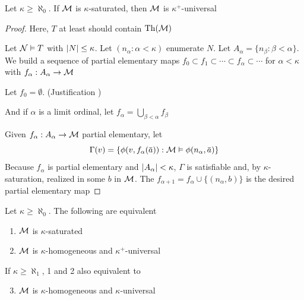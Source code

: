 \documentclass[11pt]{article}
\begin{document}
\begin{lemma}[]
\label{lemma4.3.17}
Let \(\kappa\ge\aleph_0\). If \(\mathcal{M}\) is \(\kappa\)-saturated, then \(\mathcal{M}\) is \(\kappa^+\)-universal
\end{lemma}

\begin{proof}
Here, \(T\) at least should contain \(\operatorname{Th}(\mathcal{M})\)

Let \(\mathcal{N}\vDash T\) with \(\abs{N}\le\kappa\). Let \((n_\alpha:\alpha<\kappa)\) enumerate \(N\). Let \(A_\alpha=\{n_\beta:\beta<\alpha\}\). We
build a sequence of partial elementary maps \(f_0\subset f_1\subset\cdots\subset f_\alpha\subset\cdots\) for \(\alpha<\kappa\) with \(f_\alpha:A_\alpha\to\mathcal{M}\)

Let \(f_0=\emptyset\). (Justification \label{Problem6})

And if \(\alpha\) is a limit ordinal, let \(f_\alpha=\bigcup_{\beta<\alpha}f_\beta\)

Given \(f_\alpha:A_\alpha\to\mathcal{M}\) partial elementary, let
\begin{equation*}
\Gamma(v)=\{\phi(v,f_\alpha(\bara)):\calm\vDash\phi(n_\alpha,\bara)\}
\end{equation*}
Because \(f_\alpha\) is partial elementary and \(\abs{A_\alpha}<\kappa\), \(\Gamma\) is satisfiable and, by
\(\kappa\)-saturation, realized in some \(b\) in \(\mathcal{M}\). The \(f_{\alpha+1}=f_\alpha\cup\{(n_\alpha,b)\}\) is the desired
partial elementary map
\end{proof}

\begin{theorem}[]
Let \(\kappa\ge\aleph_0\). The following are equivalent
\begin{enumerate}
\item \(\mathcal{M}\) is \(\kappa\)-saturated
\item \(\mathcal{M}\) is \(\kappa\)-homogeneous and \(\kappa^+\)-universal
\end{enumerate}


If \(\kappa\ge\aleph_1\), 1 and 2 also equivalent to
\begin{enumerate}
\setcounter{enumi}{2}
\item \(\mathcal{M}\) is \(\kappa\)-homogeneous and \(\kappa\)-universal
\end{enumerate}
\end{theorem}
\end{document}
